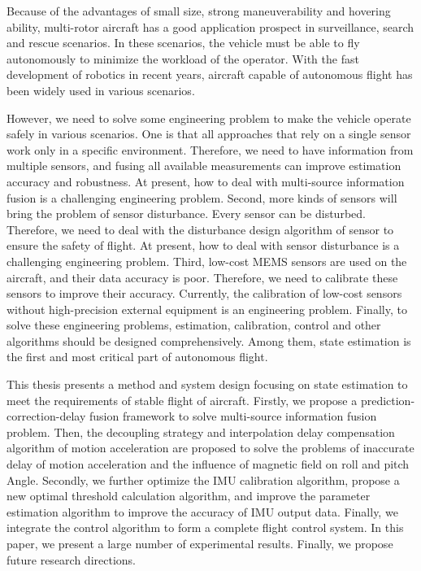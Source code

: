 \documentclass[
  type=master
]{gdutthesis}
\begin{document}
\begin{abstract*}
  Because of the advantages of small size, strong maneuverability and hovering ability, multi-rotor aircraft has a good application prospect in surveillance, search and rescue scenarios.
  In these scenarios, the vehicle must be able to fly autonomously to minimize the workload of the operator.
  With the fast development of robotics in recent years, aircraft capable of autonomous flight has been widely used in various scenarios.
  
  However, we need to solve some engineering problem to make the vehicle operate safely in various scenarios.
  One is that all approaches that rely on a single sensor work only in a specific environment.
  Therefore, we need to have information from multiple sensors, and fusing all available measurements can improve estimation accuracy and robustness.
  At present, how to deal with multi-source information fusion is a challenging engineering problem.
  Second, more kinds of sensors will bring the problem of sensor disturbance.
  Every sensor can be disturbed.
  Therefore, we need to deal with the disturbance design algorithm of sensor to ensure the safety of flight.
  At present, how to deal with sensor disturbance is a challenging engineering problem.
  Third, low-cost MEMS sensors are used on the aircraft, and their data accuracy is poor.
  Therefore, we need to calibrate these sensors to improve their accuracy.
  Currently, the calibration of low-cost sensors without high-precision external equipment is an engineering problem.
  Finally, to solve these engineering problems, estimation, calibration, control and other algorithms should be designed comprehensively.
  Among them, state estimation is the first and most critical part of autonomous flight.
  
  This thesis presents a method and system design focusing on state estimation to meet the requirements of stable flight of aircraft.
  Firstly, we propose a prediction-correction-delay fusion framework to solve multi-source information fusion problem.
  Then, the decoupling strategy and interpolation delay compensation algorithm of motion acceleration are proposed to solve the problems of inaccurate delay of motion acceleration and the influence of magnetic field on roll and pitch Angle.
  Secondly, we further optimize the IMU calibration algorithm, propose a new optimal threshold calculation algorithm, and improve the parameter estimation algorithm to improve the accuracy of IMU output data.
  Finally, we integrate the control algorithm to form a complete flight control system.
  In this paper, we present a large number of experimental results.
  Finally, we propose future research directions.
\end{abstract*}
\end{document}
